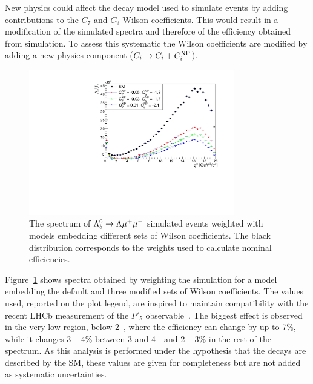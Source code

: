 New physics could affect the decay model used to simulate events by adding contributions to the $C_7$ and $C_9$ 
Wilson coefficients. This would result in a modification of the simulated \qsq spectra and therefore of the efficiency obtained 
from simulation. To assess this systematic the Wilson coefficients are modified by adding a new physics component
($C_i \rightarrow C_i + C_i^{ \rm NP}$). 
\begin{figure}[hb]
\centering
\includegraphics[width=0.8\textwidth]{Lmumu/figs/wilson_q2.pdf}
\caption{The \qsq spectrum of $\Lambda^0_b\rightarrow\Lambda\mu^+\mu^-$ simulated events weighted with models embedding different sets of Wilson coefficients.
The black distribution corresponds to the weights used to calculate nominal efficiencies.}
\label{fig:wilson_q2}
\end{figure}
Figure~\ref{fig:wilson_q2} shows \qsq spectra
obtained by weighting the simulation for a model embedding the default and three modified sets
of Wilson coefficients. The values used, reported on the plot legend, are inspired
to maintain compatibility with the recent LHCb measurement of the $P'_5$ observable~\cite{Descotes-Genon:2013wba}.
The biggest effect is observed in the very low \qsq region, below 2~\gevgevcccc, where the efficiency can change
by up to 7\%, while it changes 3 -- 4\% between 3 and 4~\gevgevcccc~and 2 -- 3\% in the rest of the spectrum.
As this analysis is performed under the hypothesis that the decays are described by the SM,
these values are given for completeness but are not added 
as systematic uncertainties. 


